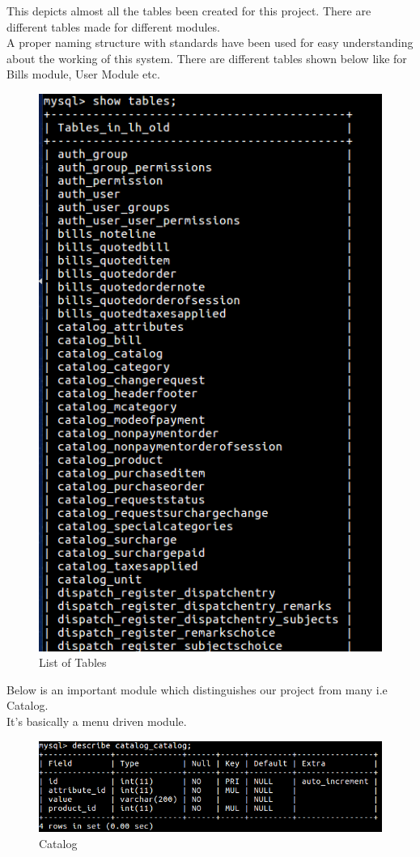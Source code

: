 This depicts almost all the tables been created for this project. There are different tables made for different modules.\\
A proper naming structure with standards have been used for easy understanding about the working of this system. There are different tables shown below like for Bills module, User Module etc.
\begin{figure}[h!]
\centering \includegraphics[scale=0.4]{input/images/t1.png}
\caption{ List of Tables}
\label{fig:UI1}
\end{figure}

Below is an important module which distinguishes our project from many i.e Catalog.\\
It's basically a menu driven module.

\begin{figure}[h!]
\centering \includegraphics[scale=0.4]{input/images/t2.png}
\caption{ Catalog}
\label{fig:UI1}
\end{figure}

